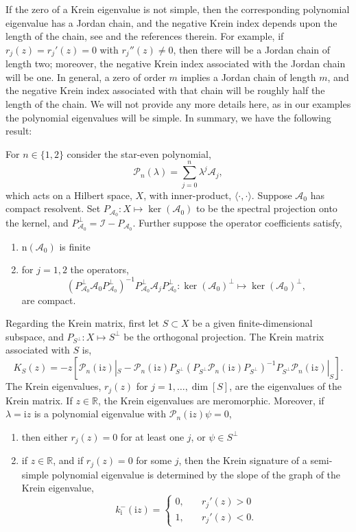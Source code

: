 \documentclass[review,onefignum,onetabnum]{siamart171218}
\newcommand{\R}{\mathbb{R}}
\def\dim{\mathop\mathrm{dim}\nolimits}
\def\ker{\mathop\mathrm{ker}\nolimits}
\newcommand{\rmi}{\mathrm{i}}
\newcommand{\rmn}{\mathrm{n}}
\newcommand{\calA}{\mathcal{A}}
\newcommand{\calI}{\mathcal{I}}
\newcommand{\calP}{\mathcal{P}}
\newcommand{\vK}{\bm{\mathit{K}}}
\begin{document}
If the zero of a Krein eigenvalue is not simple, then the corresponding
polynomial eigenvalue has a Jordan chain, and the negative Krein index
depends upon the length of the chain, see \cite[Section~2.2]{kapitula:tks10} and the references therein. For example, if $r_j(z)=r_j'(z)=0$ with $r_j''(z)\neq0$, then there will be a Jordan chain of length two; moreover, the negative Krein index associated with the Jordan chain will be one. In general, a zero of order $m$ implies a Jordan chain of length $m$, and the negative Krein index associated with that chain will be roughly half the length of the chain. We
will not provide any more details here, as in our examples the polynomial eigenvalues will be simple. In summary,
we have the following result:

\begin{theorem}\label{thm:krein}
For $n\in\{1,2\}$ consider the star-even polynomial,
\[
\calP_n(\lambda)=\sum_{j=0}^n\lambda^j\calA_j,
\]
which acts on a Hilbert space, $X$, with inner-product,
$\langle\cdot,\cdot\rangle$.  Suppose $\calA_0$ has compact resolvent. Set $P_{\calA_0}:X\mapsto\ker(\calA_0)$ to be the spectral projection onto the kernel, and
    $P_{\calA_0}^\perp=\calI-P_{\calA_0}$. Further suppose the operator coefficients satisfy,
\begin{enumerate}
\item $\rmn(\calA_0)$ is finite
\item for $j=1,2$ the
    operators,
\[
\left(P_{\calA_0}^\perp\calA_0P_{\calA_0}^\perp\right)^{-1}
P_{\calA_0}^\perp\calA_jP_{\calA_0}^\perp:\ker(\calA_0)^\perp\mapsto\ker(\calA_0)^\perp,
\]
are compact.
\end{enumerate}
Regarding the Krein matrix, first let $S\subset X$ be a given finite-dimensional subspace, and $P_{S^\perp}:X\mapsto S^\perp$ be the orthogonal
projection. The Krein matrix associated with $S$ is,
\[
\vK_S(z)=-z\left[\calP_n(\rmi z)|_S-%
\calP_n(\rmi z)P_{S^\perp}(P_{S^\perp}\calP_n(\rmi z)P_{S^\perp})^{-1}P_{S^\perp}\calP_n(\rmi z)|_{S}\right].
\]
The Krein eigenvalues, $r_j(z)$ for $j=1,\dots,\dim[S]$, are the eigenvalues of the Krein matrix. If $z\in\R$, the Krein eigenvalues are meromorphic. Moreover, if $\lambda=\rmi z$ is a polynomial
eigenvalue with $\calP_n(\rmi z)\psi=0$,
\begin{enumerate}
\item then either $r_j(z)=0$ for at least one $j$, or $\psi\in S^\perp$
\item if $z\in\R$, and if $r_j(z)=0$ for some $j$, then the Krein
    signature of a semi-simple polynomial eigenvalue is determined by the slope of the graph of the Krein eigenvalue,
\[
k_\rmi^-(\rmi z)=\begin{cases}0,\quad&r_j'(z)>0\\1,\quad&r_j'(z)<0.\end{cases}
\]
\end{enumerate}
\end{theorem}
\end{document}
